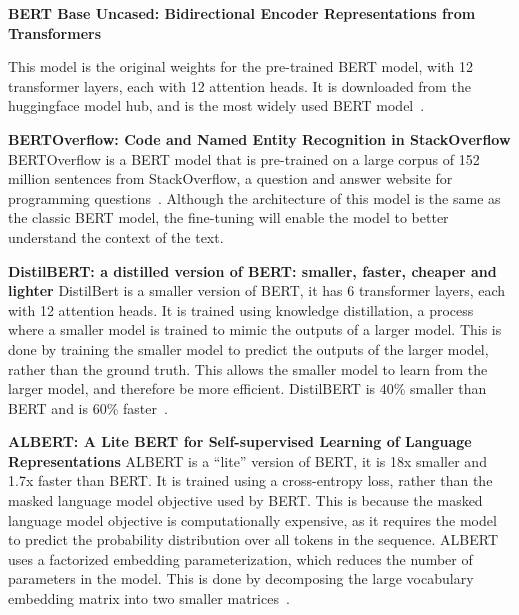 \documentclass{UoYCSproject}
\begin{document}
    \par

    \textbf{BERT Base Uncased: Bidirectional Encoder Representations from Transformers}

    This model is the original weights for the pre-trained BERT model, with 12 transformer layers, each with 12 attention heads.
    It is downloaded from the huggingface model hub, and is the most widely used BERT model~\cite{bert-base-uncased}.
    \par

    \textbf{BERTOverflow: Code and Named Entity Recognition in StackOverflow}
    BERTOverflow is a BERT model that is pre-trained on a large corpus of 152 million sentences from StackOverflow, a question and answer website for programming questions~\cite{tabassum2020code}.
    Although the architecture of this model is the same as the classic BERT model, the fine-tuning will enable the model to better understand the context of the text.
    \par

    \textbf{DistilBERT: a distilled version of BERT: smaller, faster, cheaper and lighter}
    DistilBert is a smaller version of BERT, it has 6 transformer layers, each with 12 attention heads.
    It is trained using knowledge distillation, a process where a smaller model is trained to mimic the outputs of a larger model.
    This is done by training the smaller model to predict the outputs of the larger model, rather than the ground truth.
    This allows the smaller model to learn from the larger model, and therefore be more efficient.
    DistilBERT is 40\% smaller than BERT and is 60\% faster~\cite{sanh2020distilbert}.
    \par

    \textbf{ALBERT: A Lite BERT for Self-supervised Learning of Language Representations}
    ALBERT is a ``lite'' version of BERT, it is 18x smaller and 1.7x faster than BERT.
    It is trained using a cross-entropy loss, rather than the masked language model objective used by BERT.
    This is because the masked language model objective is computationally expensive, as it requires the model to predict the probability distribution over all tokens in the sequence.
    ALBERT uses a factorized embedding parameterization, which reduces the number of parameters in the model.
    This is done by decomposing the large vocabulary embedding matrix into two smaller matrices~\cite{sanh2020distilbert}.
    \par
\end{document}
